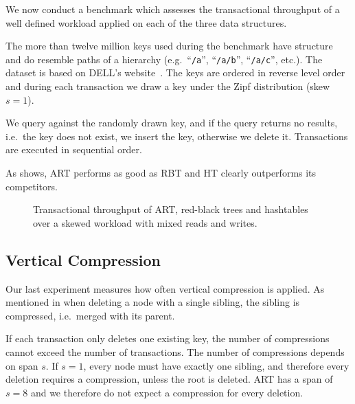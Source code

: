 \documentclass[abstracton,12pt]{scrartcl}
\theoremstyle{definition}
\begin{document}
We now conduct a benchmark which assesses the transactional throughput of 
a well defined workload applied on each of the three data structures.

The more than twelve million keys used during the benchmark have structure
and do resemble paths of a hierarchy (e.g.\ ``\texttt{/a}'', ``\texttt{/a/b}'',
``\texttt{/a/c}'', etc.). The dataset is based on DELL's 
website~\cite{wellenzohn2017wapi}.
The keys are ordered in reverse level order and during each transaction we
draw a key under the Zipf distribution (skew $s=1$).

We query against the randomly drawn key, and if the query returns no results,
i.e.\ the key does not exist, we insert the key, otherwise we delete it.
Transactions are executed in sequential order.

As  shows, ART performs as good as RBT and HT clearly
outperforms its competitors.

\begin{figure}[H]
  \centering
  \caption{Transactional throughput of ART,
    red-black trees and hashtables over a skewed workload with
    mixed reads and writes.}
  \label{fig:main-benchmark}
\end{figure}

\subsection{Vertical Compression}
\label{sec:compression-benchmark}

Our last experiment measures how often vertical compression is applied.
As mentioned in  when deleting a node with
a single sibling, the sibling is compressed, i.e.\ merged with its parent.

If each transaction only deletes one existing key, the number of compressions
cannot exceed the number of transactions. The number of compressions
depends on span $s$. If $s=1$, every node must have exactly one sibling,
and therefore every deletion requires a compression, unless the root is
deleted. ART has a span of $s=8$ and we therefore do not expect a compression 
for every deletion.
\end{document}
